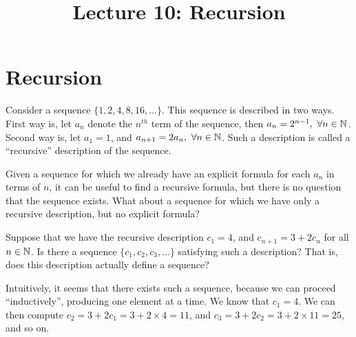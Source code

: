 \documentclass[a4paper,english,12pt]{article}
\title{Lecture 10: Recursion}
\author{}
\begin{document}
\maketitle
\section{Recursion}
Consider a sequence $\{1, 2, 4, 8, 16, \ldots\}$. This sequence is described in two ways. First way is, let $a_n$ denote the $n^{th}$ term of the sequence, then $a_n=2^{n-1},~ \forall n\in \mathbb{N}$. Second way is, let $a_1 =1$, and $a_{n+1}=2a_n,~ \forall n\in \mathbb{N}$. Such a description is called a ``recursive'' description of the sequence.

Given a sequence for which we already have an explicit formula for each $a_n$ in terms of $n$, it can be useful to find a recursive formula, but there is no question that the sequence exists. What about a sequence for which we have only a recursive description, but no explicit formula?

\begin{exmp} Suppose that we have the recursive description $c_1 = 4$, and $c_{n+1} = 3 + 2c_n$ for all $n \in \mathbb{N}$. Is there a sequence $\{c_1, c_2, c_3, \ldots \}$ satisfying such a description? That is, does this description actually define a sequence? 
\end{exmp}
\begin{rem}
Intuitively, it seems that there exists such a sequence, because we can proceed ``inductively'', producing one element at a time. We know that $c_1 = 4$. We can then compute $c_2 = 3 + 2 c_1 = 3 + 2 \times 4 = 11$, and $c_3 = 3 + 2c_2 = 3 + 2 \times 11 = 25$, and so on. 
\end{rem}
\end{document}
